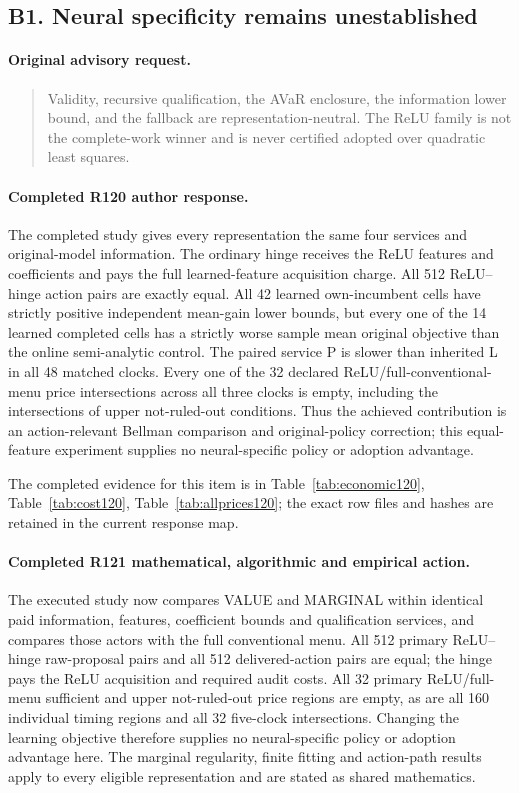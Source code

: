 \subsection{B1. Neural specificity remains unestablished}
\label{response122:B1}

\paragraph{Original advisory request.}
\begin{quote}
Validity, recursive qualification, the AVaR enclosure, the information lower bound, and the fallback are representation-neutral. The ReLU family is not the complete-work winner and is never certified adopted over quadratic least squares.
\end{quote}

\paragraph{Completed R120 author response.}
The completed study gives every representation the same four services and original-model information. The ordinary hinge receives the ReLU features and coefficients and pays the full learned-feature acquisition charge. All 512 ReLU--hinge action pairs are exactly equal. All 42 learned own-incumbent cells have strictly positive independent mean-gain lower bounds, but every one of the 14 learned completed cells has a strictly worse sample mean original objective than the online semi-analytic control. The paired service P is slower than inherited L in all 48 matched clocks. Every one of the 32 declared ReLU/full-conventional-menu price intersections across all three clocks is empty, including the intersections of upper not-ruled-out conditions. Thus the achieved contribution is an action-relevant Bellman comparison and original-policy correction; this equal-feature experiment supplies no neural-specific policy or adoption advantage.

The completed evidence for this item is in Table~\ref{tab:economic120}, Table~\ref{tab:cost120}, Table~\ref{tab:allprices120}; the exact row files and hashes are retained in the current response map.

\paragraph{Completed R121 mathematical, algorithmic and empirical action.}
The executed study now compares VALUE and MARGINAL within identical paid information, features, coefficient bounds and qualification services, and compares those actors with the full conventional menu. All 512 primary ReLU--hinge raw-proposal pairs and all 512 delivered-action pairs are equal; the hinge pays the ReLU acquisition and required audit costs. All 32 primary ReLU/full-menu sufficient and upper not-ruled-out price regions are empty, as are all 160 individual timing regions and all 32 five-clock intersections. Changing the learning objective therefore supplies no neural-specific policy or adoption advantage here. The marginal regularity, finite fitting and action-path results apply to every eligible representation and are stated as shared mathematics.

